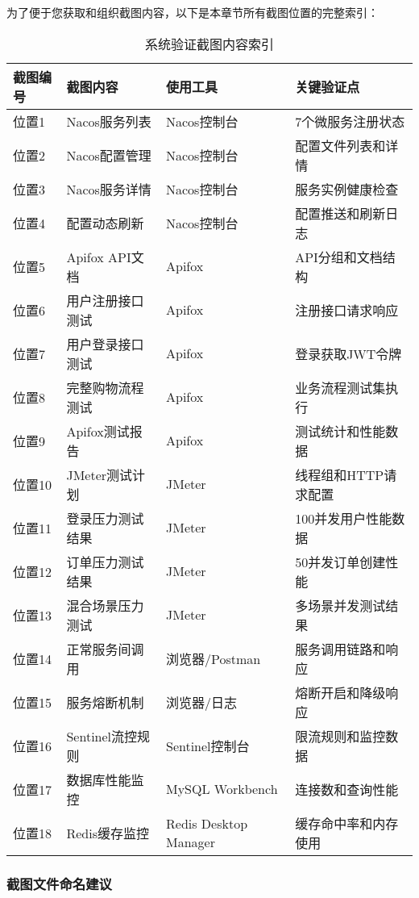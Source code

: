 \documentclass[a4paper,12pt]{article}
\begin{document}
为了便于您获取和组织截图内容，以下是本章节所有截图位置的完整索引：

\begin{table}[H]
\centering
\caption{系统验证截图内容索引}
\begin{tabular}{|p{1.5cm}|p{4cm}|p{3cm}|p{4.5cm}|}
\hline
\textbf{截图编号} & \textbf{截图内容} & \textbf{使用工具} & \textbf{关键验证点} \\
\hline
位置1 & Nacos服务列表 & Nacos控制台 & 7个微服务注册状态 \\
\hline
位置2 & Nacos配置管理 & Nacos控制台 & 配置文件列表和详情 \\
\hline
位置3 & Nacos服务详情 & Nacos控制台 & 服务实例健康检查 \\
\hline
位置4 & 配置动态刷新 & Nacos控制台 & 配置推送和刷新日志 \\
\hline
位置5 & Apifox API文档 & Apifox & API分组和文档结构 \\
\hline
位置6 & 用户注册接口测试 & Apifox & 注册接口请求响应 \\
\hline
位置7 & 用户登录接口测试 & Apifox & 登录获取JWT令牌 \\
\hline
位置8 & 完整购物流程测试 & Apifox & 业务流程测试集执行 \\
\hline
位置9 & Apifox测试报告 & Apifox & 测试统计和性能数据 \\
\hline
位置10 & JMeter测试计划 & JMeter & 线程组和HTTP请求配置 \\
\hline
位置11 & 登录压力测试结果 & JMeter & 100并发用户性能数据 \\
\hline
位置12 & 订单压力测试结果 & JMeter & 50并发订单创建性能 \\
\hline
位置13 & 混合场景压力测试 & JMeter & 多场景并发测试结果 \\
\hline
位置14 & 正常服务间调用 & 浏览器/Postman & 服务调用链路和响应 \\
\hline
位置15 & 服务熔断机制 & 浏览器/日志 & 熔断开启和降级响应 \\
\hline
位置16 & Sentinel流控规则 & Sentinel控制台 & 限流规则和监控数据 \\
\hline
位置17 & 数据库性能监控 & MySQL Workbench & 连接数和查询性能 \\
\hline
位置18 & Redis缓存监控 & Redis Desktop Manager & 缓存命中率和内存使用 \\
\hline
\end{tabular}
\end{table}

\subsubsection{截图文件命名建议}
\end{document}

